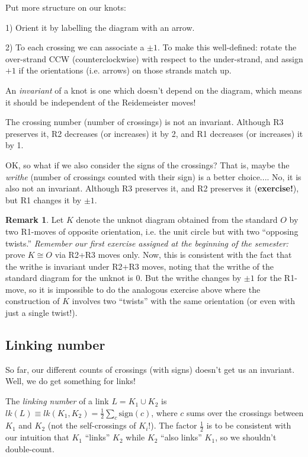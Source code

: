\documentclass[11pt]{article}
\theoremstyle{plain}
\theoremstyle{definition}
\newtheorem{remark}{Remark}
\begin{document}
Put more structure on our knots:

1) Orient it by labelling the diagram with an arrow.

2) To each crossing we can associate a $\pm1$. To make this well-defined: rotate the over-strand CCW (counterclockwise) with respect to the under-strand, and assign $+1$ if the orientations (i.e. arrows) on those strands match up.

\bigskip
An \textit{invariant} of a knot is one which doesn't depend on the diagram, which means it should be independent of the Reidemeister moves!

The crossing number (number of crossings) is not an invariant. Although R3 preserves it, R2 decreases (or increases) it by 2, and R1 decreases (or increases) it by 1.

OK, so what if we also consider the signs of the crossings? That is, maybe the \textit{writhe} (number of crossings counted with their sign) is a better choice.... No, it is also not an invariant. Although R3 preserves it, and R2 preserves it (\textbf{exercise!}), but R1 changes it by $\pm1$.

\begin{remark}
Let $K$ denote the unknot diagram obtained from the standard $O$ by two R1-moves of opposite orientation, i.e. the unit circle but with two ``opposing twists.'' \textit{Remember our first exercise assigned at the beginning of the semester:} prove $K\cong O$ via R2+R3 moves only. Now, this is consistent with the fact that the writhe is invariant under R2+R3 moves, noting that the writhe of the standard diagram for the unknot is 0. But the writhe changes by $\pm1$ for the R1-move, so it is impossible to do the analogous exercise above where the construction of $K$ involves two ``twists'' with the same orientation (or even with just a single twist!).
\end{remark}


\subsection{Linking number}

So far, our different counts of crossings (with signs) doesn't get us an invariant. Well, we do get something for links!

The \textit{linking number} of a link $L = K_1\cup K_2$ is $lk(L)\equiv lk(K_1,K_2)=\frac{1}{2}\sum_c\text{sign}(c)$, where $c$ sums over the crossings between $K_1$ and $K_2$ (not the self-crossings of $K_i$!). The factor $\frac{1}{2}$ is to be consistent with our intuition that $K_1$ ``links'' $K_2$ while $K_2$ ``also links'' $K_1$, so we shouldn't double-count.
\end{document}
